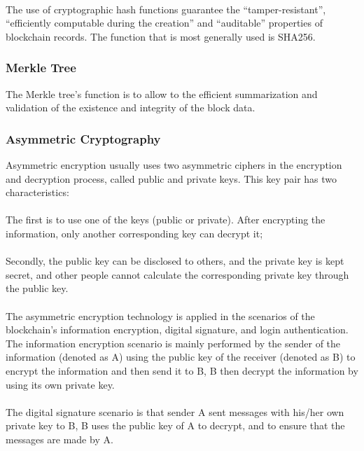 \documentclass[doublespacing]{bmcart}
\begin{document}
\begin{CJK*}{UTF8}{gbsn}
\paragraph{} The use of cryptographic hash functions guarantee the ``tamper-resistant'', ``efficiently computable during the creation'' and ``auditable'' properties of blockchain records. The function that is most generally used is SHA256.
\subsubsection*{Merkle Tree}
The Merkle tree's function is to allow to the efficient summarization and validation of the existence and integrity of the block data.
\subsubsection*{Asymmetric Cryptography}
Asymmetric encryption usually uses two asymmetric ciphers in the encryption and decryption process, called public and private keys. This key pair has two characteristics: \paragraph{} The first is to use one of the keys (public or private). After encrypting the information, only another corresponding key can decrypt it; 
\paragraph{} Secondly, the public key can be disclosed to others, and the private key is kept secret, and other people cannot calculate the corresponding private key through the public key. 
\paragraph{} The asymmetric encryption technology is applied in the scenarios of the blockchain's information encryption, digital signature, and login authentication. The information encryption scenario is mainly performed by the sender of the information (denoted as A) using the public key of the receiver (denoted as B) to encrypt the information and then send it to B, B  then decrypt the information by using its own private key. 
\paragraph{} The digital signature scenario is that sender A sent messages with his/her own private key to B, B uses the public key of A to decrypt, and to ensure that the messages are made by A. 

\end{CJK*}
\end{document}
